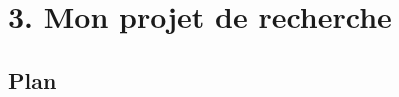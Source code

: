 \documentclass[11pt,english,ignorenonframetext,]{beamer}
\providecommand{\tightlist}{%
  \setlength{\itemsep}{0pt}\setlength{\parskip}{0pt}}
\begin{document}









\section{\hfill{}3. Mon projet de recherche\hfill{}}

\subsection{\hfill{}Plan\hfill{}}
\end{document}
